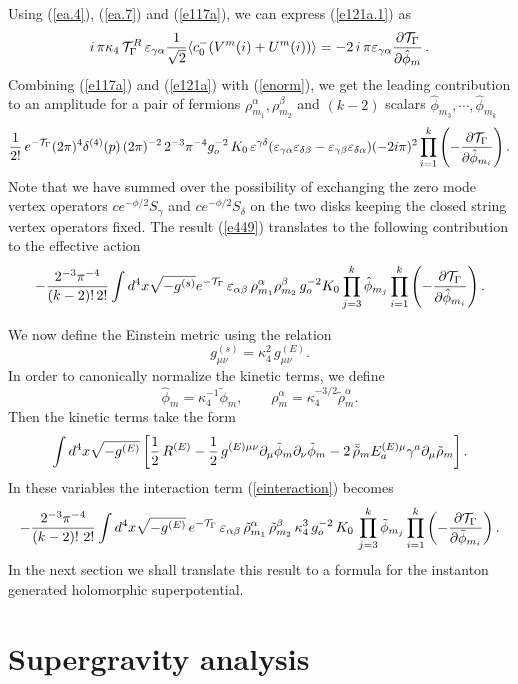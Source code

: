 \documentclass[12pt,a4paper]{article}
\newcommand{\be}{\begin{equation}}
\newcommand{\ee}{\end{equation}}
\newcommand{\refb}[1]{(\ref{#1})}
\newcommand{\p}{\partial}
\newcommand{\I}{\mathrm{i}}
\def\[{\left[}
\def\]{\right]}
\newcommand{\ve}{\varepsilon}
\newcommand{\cT}{\mathcal{T}}
\def\KKZ{K_0}
\def\I{i}
\def\xxi{\rho}
\begin{document}
Using \refb{ea.4}, \refb{ea.7} and \refb{e117a}, we can express \refb{e121a.1} as
\be\label{e121a}
\I\, \pi\kappa_4\, \cT^R_\Gamma \, \ve_{\gamma\alpha}
{1\over \sqrt 2}  \langle c_0^- (V^{m}(i)+U^{m}(i))\rangle
=
-2\, \I\, \pi
\ve_{\gamma\alpha} {\p \cT_\Gamma\over \p \hat\phi_m}\, .
\ee
Combining \refb{e117a} and \refb{e121a} with \refb{enorm}, we get the leading
contribution to an amplitude for
a pair of fermions $\rho_{m_1}^\alpha, \rho_{m_2}^\beta$ and $(k-2)$ scalars
$\hat\phi_{m_3},\cdots,\hat\phi_{m_k}$
\be\label{e449}
{1\over 2!} \, e^{-\cT_\Gamma} (2\pi)^4 \delta^{(4)}(p)\,
(2\pi)^{-2}\, 2^{-3}\pi^{-4} g_o^{-2} \,
\KKZ\, \ve^{\gamma\delta} (\ve_{\gamma\alpha}\ve_{\delta\beta}-
\ve_{\gamma\beta}\ve_{\delta\alpha}) (-2i\pi)^2
\prod_{i=1}^k \left(-{\p \cT_\Gamma\over \p \hat\phi_{m_i}} \right) .
\ee
Note that we have summed over the
possibility of exchanging the zero mode vertex operators
$c e^{-\phi/2}S_\gamma$ and $c e^{-\phi/2}S_\delta$ on the two disks keeping the
closed string vertex operators fixed. The result \refb{e449} translates to the following contribution
to the effective action
\be \label{einteraction}
-{2^{-3} \pi^{-4} \over (k-2)! \, 2!} \int d^4 x \sqrt{-  g^{(s)}}e^{-\cT_\Gamma}\,
\ve_{\alpha\beta} \, \xxi_{m_1}^\alpha \xxi_{m_2}^\beta
\, g_o^{-2}  \KKZ \prod_{j=3}^k \hat\phi_{m_j}
\prod_{i=1}^k \left(-{\p \cT_\Gamma\over \p \hat\phi_{m_i}}
\right) .
\ee

We now define the Einstein metric using the relation
\be
g^{(s)}_{\mu\nu}= \kappa_4^2\, g^{(E)}_{\mu\nu}.
\ee
In order to canonically normalize the kinetic terms, we define
\be
\hat\phi_m = \kappa_4 ^{-1} \tilde\phi_m, \qquad \xxi_m^\alpha = \kappa_4 ^{-3/2} \tilde\xxi_m^\alpha.
\ee
Then the  kinetic terms take the form
\be
\int d^4 x \sqrt{-  g^{(E)}} \[{1\over 2}\,R^{(E)}
- {1\over 2}\, g^{(E)\mu\nu}\p_\mu\tilde\phi_m \p_\nu\tilde\phi_m
- 2 \,\bar {\tilde\xxi}_m E^{(E)\mu}_a \gamma^a\p_\mu \tilde\xxi_m\].
\label{renorm-lagrang}
\ee
In these variables the interaction term \refb{einteraction} becomes
\be \label{einteractiontwo}
-{2^{-3} \pi^{-4} \over (k-2)! \ 2!}
\int d^4 x \sqrt{-  g^{(E)}}\, e^{-\cT_\Gamma} \, \ve_{\alpha\beta} \,
\tilde\xxi_{m_1}^\alpha\, \tilde\xxi_{m_2}^\beta\,
\kappa_4^3 \, g_o^{-2}  \, \KKZ\, \prod_{j=3}^k \tilde\phi_{m_j}
\prod_{i=1}^k \left(-{\p \cT_\Gamma\over \p \tilde\phi_{m_i}}
\right) .
\ee
In the next section we shall translate this result to a formula for the instanton generated holomorphic
superpotential.


\section{Supergravity analysis} \label{ssugra}
\end{document}
